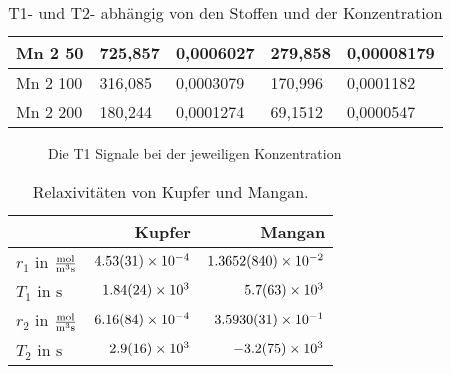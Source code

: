 \begin{table}[H]
\begin{tabular}{lllll}
    \multicolumn{1}{|l|}{Mn 2 50}     & \multicolumn{1}{l|}{725,857} & \multicolumn{1}{l|}{0,0006027} & \multicolumn{1}{l|}{279,858} & \multicolumn{1}{l|}{0,00008179} \\ \hline
    \multicolumn{1}{|l|}{Mn 2 100}    & \multicolumn{1}{l|}{316,085} & \multicolumn{1}{l|}{0,0003079} & \multicolumn{1}{l|}{170,996} & \multicolumn{1}{l|}{0,0001182}  \\ \hline
    \multicolumn{1}{|l|}{Mn 2 200}    & \multicolumn{1}{l|}{180,244} & \multicolumn{1}{l|}{0,0001274} & \multicolumn{1}{l|}{69,1512} & \multicolumn{1}{l|}{0,0000547}  \\ \hline
    \end{tabular}
    \caption{T1- und T2- abhängig von den Stoffen und der Konzentration}
     \end{table}

    \begin{figure}[H]
        \centering
        
        \caption{Die T1 Signale bei der jeweiligen Konzentration}
    \end{figure}

    \begin{table}[H]
        \centering
        \caption{Relaxivitäten von Kupfer und Mangan.}
        \begin{tabular}{|l||r|r|} \hline
                & Kupfer    & Mangan    \\    \hline \hline
            $r_{1}$ in $\si{\frac{\mol}{\metre \cubed \second}}$    & $\SI{4.53 \pm 0.31e-4}{}$   & $\SI{1.3652 \pm 0.084e-2}{}$    \\    \hline
            $T_{1}$ in $\si{\second}$                               & $\SI{1.84 \pm 0.24e3}{}$    & $\SI{5.7    \pm 6.3e3}{}$       \\    \hline
            $r_{2}$ in $\si{\frac{\mol}{\metre \cubed \second}}$    & $\SI{6.16 \pm 0.84e-4}{}$   & $\SI{3.593  \pm 0.0031e-1}{}$   \\    \hline
            $T_{2}$ in $\si{\second}$                               & $\SI{2.9  \pm 1.6e3}{}$     & $\SI{-3.2   \pm 7.5e3}{}$       \\    \hline
        \end{tabular} 
        \label{tab:Relaxivitat} 
    \end{table}
    
